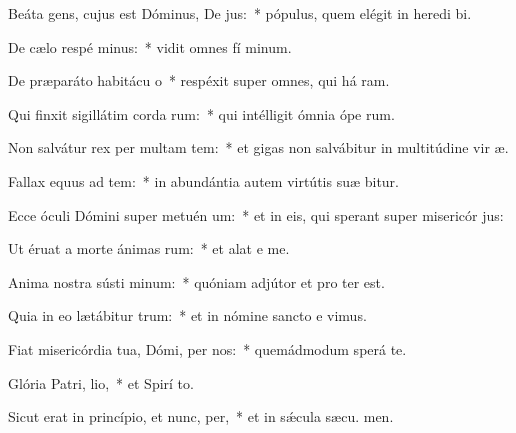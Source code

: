 \item Beáta gens, cujus est Dóminus, De jus:~* pópulus, quem elégit in heredi bi.
\item De cælo respé minus:~* vidit omnes fí minum.
\item De præparáto habitácu o~* respéxit super omnes, qui há ram.
\item Qui finxit sigillátim corda rum:~* qui intélligit ómnia ópe rum.
\item Non salvátur rex per multam tem:~* et gigas non salvábitur in multitúdine vir æ.
\item Fallax equus ad tem:~* in abundántia autem virtútis suæ  bitur.
\item Ecce óculi Dómini super metuén um:~* et in eis, qui sperant super misericór jus:
\item Ut éruat a morte ánimas rum:~* et alat e  me.
\item Anima nostra sústi minum:~* quóniam adjútor et pro ter est.
\item Quia in eo lætábitur  trum:~* et in nómine sancto e vimus.
\item Fiat misericórdia tua, Dómi, per nos:~* quemádmodum sperá  te.
\item Glória Patri,  lio,~* et Spirí to.
\item Sicut erat in princípio, et nunc,  per,~* et in sǽcula sæcu. men.
